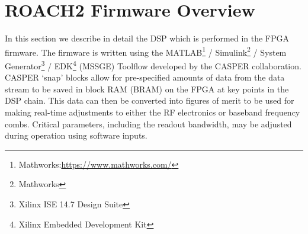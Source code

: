 \section{ROACH2 Firmware Overview}\label{firmware}

In this section we describe in detail the DSP which is performed in the FPGA firmware. The firmware is written using the MATLAB\footnote{Mathworks:\url{https://www.mathworks.com/}} / Simulink\footnote{Mathworks} / System Generator\footnote{Xilinx ISE 14.7 Design Suite} / EDK\footnote{Xilinx Embedded Development Kit} (MSSGE) Toolflow developed by the CASPER collaboration. CASPER `snap' blocks allow for pre-specified amounts of data from the data stream to be saved in block RAM (BRAM) on the FPGA at key points in the DSP chain. This data can then be converted into figures of merit to be used for making real-time adjustments to either the RF electronics or baseband frequency combs. Critical parameters, including the readout bandwidth, may be adjusted during operation using software inputs.

